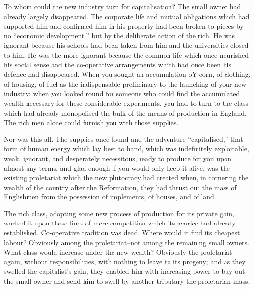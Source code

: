 \documentclass{book}
\begin{document}
To whom could the new industry turn for capitalisation? The small owner had already largely disappeared. The corporate life and mutual obligations which had supported him and confirmed him in his property had been broken to pieces by no “economic development,” but by the deliberate action of the rich. He was ignorant because his schools had been taken from him and the universities closed to him. He was the more ignorant because the common life which once nourished his social sense and the co-operative arrangements which had once been his defence had disappeared. When you sought an accumulation oY corn, of clothing, of housing, of fuel as the indispensable preliminary to the launching of your new industry; when you looked round for someone who could find the accumulated wealth necessary for these considerable experiments, you had to turn to the class which had already monopolised the bulk of the means of production in England. The rich men alone could furnish you with those supplies.

Nor was this all. The supplies once found and the adventure “capitalised,” that form of human energy which lay best to hand, which was indefinitely exploitable, weak, ignorant, and desperately necessitous, ready to produce for you upon almost any terms, and glad enough if you would only keep it alive, was the existing proletariat which the new plutocracy had created when, in cornering the wealth of the country after the Reformation, they had thrust out the mass of Englishmen from the possession of implements, of houses, and of land.

The rich class, adopting some new process of production for its private gain, worked it upon those lines of mere competition which its avarice had already established. Co-operative tradition was dead. Where would it find its cheapest labour? Obviously among the proletariat–not among the remaining small owners. What class would increase under the new wealth? Obviously the proletariat again, without responsibilities, with nothing to leave to its progeny; and as they swelled the capitalist’s gain, they enabled him with increasing power to buy out the small owner and send him to swell by another tributary the proletarian mass.
\end{document}
